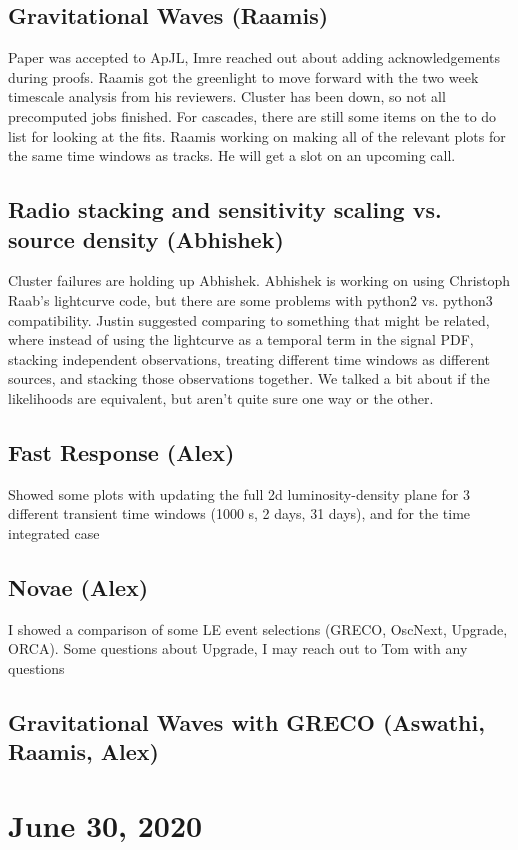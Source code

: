 \section{Gravitational Waves (Raamis)}
Paper was accepted to ApJL, Imre reached out about adding acknowledgements during proofs. Raamis got the greenlight to move forward with the two week timescale analysis from his reviewers. Cluster has been down, so not all precomputed jobs finished. For cascades, there are still some items on the to do list for looking at the fits. Raamis working on making all of the relevant plots for the same time windows as tracks. He will get a slot on an upcoming call.

\section{Radio stacking and sensitivity scaling vs. source density (Abhishek)}
Cluster failures are holding up Abhishek. Abhishek is working on using Christoph Raab's lightcurve code, but there are some problems with python2 vs. python3 compatibility. Justin suggested comparing to something that might be related, where instead of using the lightcurve as a temporal term in the signal PDF, stacking independent observations, treating different time windows as different sources, and stacking those observations together. We talked a bit about if the likelihoods are equivalent, but aren't quite sure one way or the other.

\section{Fast Response (Alex)}
Showed some plots with updating the full 2d luminosity-density plane for 3 different transient time windows (1000 s, 2 days, 31 days), and for the time integrated case

\section{Novae (Alex)}
I showed a comparison of some LE event selections (GRECO, OscNext, Upgrade, ORCA). Some questions about Upgrade, I may reach out to Tom with any questions

\section{Gravitational Waves with GRECO (Aswathi, Raamis, Alex)}


\chapter{June 30, 2020}
